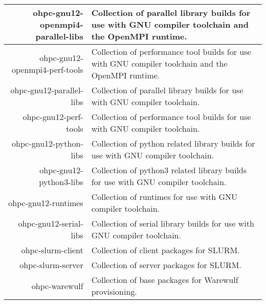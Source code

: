\begin{tabularx}{\textwidth}{r|X}
\hline
ohpc-gnu12-openmpi4-parallel-libs & Collection of parallel library builds for use with GNU compiler toolchain and the OpenMPI runtime. \\ 
\hline
ohpc-gnu12-openmpi4-perf-tools & Collection of performance tool builds for use with GNU compiler toolchain and the OpenMPI runtime. \\ 
\hline
ohpc-gnu12-parallel-libs & Collection of parallel library builds for use with GNU compiler toolchain. \\ 
\hline
ohpc-gnu12-perf-tools & Collection of performance tool builds for use with GNU compiler toolchain. \\ 
\hline
ohpc-gnu12-python-libs & Collection of python related library builds for use with GNU compiler toolchain. \\ 
\hline
ohpc-gnu12-python3-libs & Collection of python3 related library builds for use with GNU compiler toolchain. \\ 
\hline
ohpc-gnu12-runtimes & Collection of runtimes for use with GNU compiler toolchain. \\ 
\hline
ohpc-gnu12-serial-libs & Collection of serial library builds for use with GNU compiler toolchain. \\ 
\hline
ohpc-slurm-client & Collection of client packages for SLURM. \\ 
\hline
ohpc-slurm-server & Collection of server packages for SLURM. \\ 
\hline
ohpc-warewulf & Collection of base packages for Warewulf provisioning. \\ 
\hline
\bottomrule
\end{tabularx}
